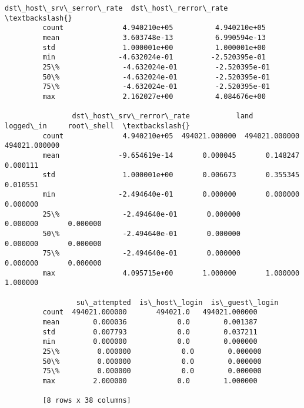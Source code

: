 \documentclass[11pt]{article}
\begin{document}
\begin{Verbatim}[commandchars=\\\{\}]
                dst\_host\_srv\_serror\_rate  dst\_host\_rerror\_rate  \textbackslash{}
         count              4.940210e+05          4.940210e+05   
         mean               3.603748e-13          6.990594e-13   
         std                1.000001e+00          1.000001e+00   
         min               -4.632024e-01         -2.520395e-01   
         25\%               -4.632024e-01         -2.520395e-01   
         50\%               -4.632024e-01         -2.520395e-01   
         75\%               -4.632024e-01         -2.520395e-01   
         max                2.162027e+00          4.084676e+00   
         
                dst\_host\_srv\_rerror\_rate           land      logged\_in     root\_shell  \textbackslash{}
         count              4.940210e+05  494021.000000  494021.000000  494021.000000   
         mean              -9.654619e-14       0.000045       0.148247       0.000111   
         std                1.000001e+00       0.006673       0.355345       0.010551   
         min               -2.494640e-01       0.000000       0.000000       0.000000   
         25\%               -2.494640e-01       0.000000       0.000000       0.000000   
         50\%               -2.494640e-01       0.000000       0.000000       0.000000   
         75\%               -2.494640e-01       0.000000       0.000000       0.000000   
         max                4.095715e+00       1.000000       1.000000       1.000000   
         
                 su\_attempted  is\_host\_login  is\_guest\_login  
         count  494021.000000       494021.0   494021.000000  
         mean        0.000036            0.0        0.001387  
         std         0.007793            0.0        0.037211  
         min         0.000000            0.0        0.000000  
         25\%         0.000000            0.0        0.000000  
         50\%         0.000000            0.0        0.000000  
         75\%         0.000000            0.0        0.000000  
         max         2.000000            0.0        1.000000  
         
         [8 rows x 38 columns]
\end{Verbatim}
            
\end{document}
